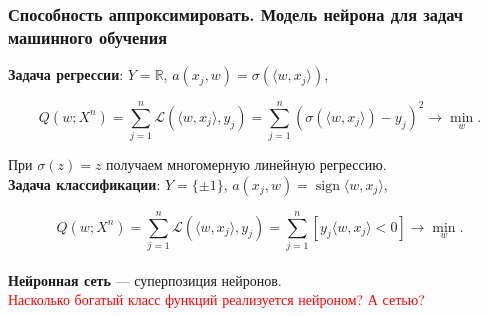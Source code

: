 \documentclass[10pt]{beamer}
\DeclareMathOperator*{\sign}{sign}
\begin{document}
\begin{frame}
\frametitle{Способность аппроксимировать. Модель нейрона для задач машинного обучения}
\textbf{Задача регрессии}: $Y= \mathbb{R}$, $a(x_j,w) = \sigma( \langle w,x_j \rangle )$,

\begin{equation*}
Q(w; X^{n})=\sum_{j=1}^{n} \mathscr{L} \left( \langle w,x_j \rangle, y_j \right)=\sum_{j=1}^{n}\left( \sigma( \langle w,x_j \rangle ) -y_j \right)^2 \rightarrow \min_{w}.
\end{equation*}

При $\sigma(z) = z$ получаем многомерную линейную регрессию.\\
\vspace{0.9cm}
\textbf{Задача классификации}: $Y =\{ \pm 1 \}$, $a(x_j,w) = \sign \langle w,x_j \rangle$,

\begin{equation*}
Q(w; X^{n})=\sum_{j=1}^{n} \mathscr{L} \left( \langle w,x_j \rangle, y_j \right) = \sum_{j=1}^{n} [y_j \langle w,x_j \rangle  < 0] \rightarrow \min_{w}.
\end{equation*}\\
\vspace{0.9cm}
\textbf{Нейронная сеть} --- суперпозиция нейронов.\\
\textcolor{red}{Насколько богатый класс функций реализуется нейроном? А сетью?}
\end{frame} 
  
\end{document}
